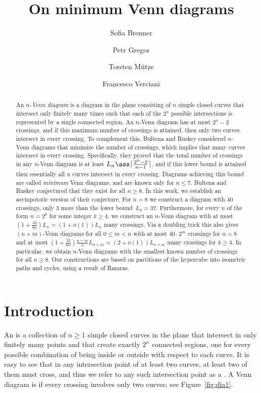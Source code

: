 \documentclass[a4paper,11pt,reqno]{amsart}
\title{On minimum Venn diagrams}
\author{Sofia Brenner}
\author{Petr Gregor}
\author{Torsten M\"utze}
\author{Francesco Verciani}
\begin{document}
\begin{abstract}
An \emph{$n$-Venn diagram} is a diagram in the plane consisting of $n$ simple closed curves that intersect only finitely many times such that  each of the $2^n$ possible intersections is represented by a single connected region.
An $n$-Venn diagram has at most $2^n-2$ crossings, and if this maximum number of crossings is attained, then only two curves intersect in every crossing.
To complement this, Bultena and Ruskey considered $n$-Venn diagrams that minimize the number of crossings, which implies that many curves intersect in every crossing.
Specifically, they proved that the total number of crossings in any $n$-Venn diagram is at least $L_n\ass\lceil\frac{2^n-2}{n-1}\rceil$, and if this lower bound is attained then essentially all $n$ curves intersect in every crossing.
Diagrams achieving this bound are called \emph{minimum} Venn diagrams, and are known only for $n\leq 7$.
Bultena and Ruskey conjectured that they exist for all $n\geq 8$.
In this work, we establish an asympototic version of their conjecture.
For $n=8$ we construct a diagram with 40 crossings, only 3 more than the lower bound~$L_8=37$.
Furthermore, for every $n$ of the form $n=2^k$ for some integer $k\geq 4$, we construct an $n$-Venn diagram with at most $(1+\frac{33}{8n})L_n=(1+o(1))L_n$ many crossings.
Via a doubling trick this also gives $(n+m)$-Venn diagrams for all $0\leq m<n$ with at most $40\cdot 2^m$ crossings for $n=8$ and at most $(1+\frac{33}{8n})\frac{n+m}{n}L_{n+m}=(2+o(1))L_{n+m}$ many crossings for $k\geq 4$.
In particular, we obtain $n$-Venn diagrams with the smallest known number of crossings for all $n\geq 8$.
Our constructions are based on partitions of the hypercube into isometric paths and cycles, using a result of Ramras.
\end{abstract}

\maketitle

\section{Introduction}
\label{sec:intro}

An  is a collection of $n\geq 1$ simple closed curves in the plane that intersect in only finitely many points and that create exactly $2^n$ connected regions, one for every possible combination of being inside or outside with respect to each curve.
It is easy to see that in any intersection point of at least two curves, at least two of them must cross, and thus we refer to any such intersection point as a .
A Venn diagram is  if every crossing involves only two curves; see Figure~\ref{fig:dia1}.
\end{document}
